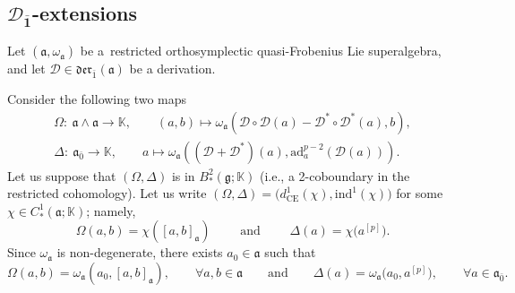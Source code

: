 \documentclass[pdftex]{sigma}
\numberwithin{equation}{section}
\begin{document}
 \subsection[D\_1-extensions]{$\boldsymbol{{\mathscr D}_{\bar 1}}$-extensions}

Let $(\mathfrak{a}, \omega_\mathfrak{a})$ be a~restricted orthosymplectic quasi-Frobenius Lie superalgebra, and let ${\mathscr D}\in \mathfrak{der}_{\bar 1}(\mathfrak{a})$ be a derivation.

Consider the following two maps
\begin{gather*}%
\Omega\colon\ \mathfrak{a}\wedge \mathfrak{a} \rightarrow \mathbb{K}, \qquad (a,b) \mapsto \omega_\mathfrak{a}( {\mathscr D} \circ {\mathscr D}(a) - {\mathscr D}^* \circ {\mathscr D}^*(a) , b), \\
\Delta\colon\ \mathfrak{a}_{\bar 0} \rightarrow \mathbb{K}, \qquad a \mapsto \omega_\mathfrak{a}(({\mathscr D}+{\mathscr D}^*)(a),\mathrm{ad}_a^{p-2}({\mathscr D}(a))).
\end{gather*}
Let us suppose that $(\Omega, \Delta)$ is in $B^2_*(\mathfrak{g};\mathbb{K})$ (i.e., a 2-coboundary in the restricted cohomology). Let us write $(\Omega, \Delta)= \bigl(d^1_{\mathrm{CE}} (\chi), \mathrm{ind}^1(\chi) \bigr)$ for some $\chi\in C^1_*(\mathfrak{a}; \mathbb{K})$; namely,
 \[
\Omega(a,b)=\chi([a,b]_\mathfrak{a}) \qquad \text{ and } \qquad \Delta(a)=\chi\bigl(a^{[p]}\bigr).
\]
Since $\omega_\mathfrak{a}$ is non-degenerate, there exists $a_0\in \mathfrak{a}$ such that
\begin{equation}
\label{EOazero}
\Omega(a,b)=\omega_\mathfrak{a}(a_0,[a,b]_\mathfrak{a}), \qquad \forall a,b \in \mathfrak{a} \qquad \text{and} \qquad \Delta(a)=\omega_\mathfrak{a}\bigl(a_0,a^{[p]}\bigr),\qquad \forall a\in \mathfrak{a}_{\bar 0}.
\end{equation}
\end{document}
